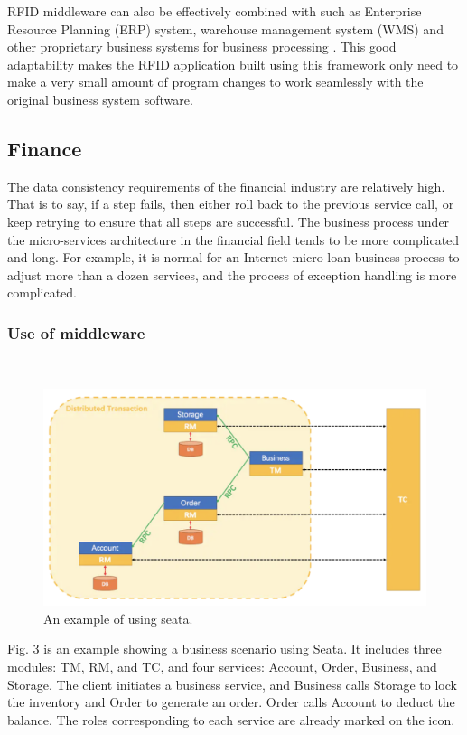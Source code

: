 \documentclass[conference]{IEEEtran}
\begin{document}
RFID middleware can also be effectively combined with such as Enterprise Resource Planning (ERP) system, warehouse management system (WMS) and other proprietary business systems for business processing \cite{b14}. This good adaptability makes the RFID application built using this framework only need to make a very small amount of program changes to work seamlessly with the original business system software.

\subsection{Finance}
The data consistency requirements of the financial industry are relatively high. That is to say, if a step fails, then either roll back to the previous service call, or keep retrying to ensure that all steps are successful. The business process under the micro-services architecture in the financial field tends to be more complicated and long. For example, it is normal for an Internet micro-loan business process to adjust more than a dozen services, and the process of exception handling is more complicated.

\subsubsection{Use of middleware}
\
\newline
\indent

\begin{figure}[h]
\centering
\includegraphics[width=1\columnwidth]{seata2}
\caption{An example of using seata.}
\label{fig}
\end{figure}

Fig. 3 is an example showing a business scenario using Seata. It includes three modules: TM, RM, and TC, and four services: Account, Order, Business, and Storage. The client initiates a business service, and Business calls Storage to lock the inventory and Order to generate an order. Order calls Account to deduct the balance. The roles corresponding to each service are already marked on the icon.
\end{document}
